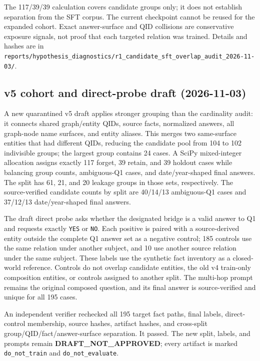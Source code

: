 \documentclass[10pt,a4paper]{article}
\begin{document}
The 117/39/39 calculation covers candidate groups only; it does not establish separation from the SFT corpus. The current checkpoint cannot be reused for the expanded cohort. Exact answer-surface and QID collisions are conservative exposure signals, not proof that each targeted relation was trained. Details and hashes are in \texttt{reports/hypothesis\_diagnostics/r1\_candidate\_sft\_overlap\_audit\_2026-11-03/}.

\subsection*{v5 cohort and direct-probe draft (2026-11-03)}

A new quarantined v5 draft applies stronger grouping than the cardinality audit: it connects shared graph/entity QIDs, source facts, normalized answers, all graph-node name surfaces, and entity aliases. This merges two same-surface entities that had different QIDs, reducing the candidate pool from 104 to 102 indivisible groups; the largest group contains 24 cases. A SciPy mixed-integer allocation assigns exactly 117 forget, 39 retain, and 39 holdout cases while balancing group counts, ambiguous-Q1 cases, and date/year-shaped final answers. The split has 61, 21, and 20 leakage groups in those sets, respectively. The source-verified candidate counts by split are 40/14/13 ambiguous-Q1 cases and 37/12/13 date/year-shaped final answers.

The draft direct probe asks whether the designated bridge is a valid answer to Q1 and requests exactly \texttt{YES} or \texttt{NO}. Each positive is paired with a source-derived entity outside the complete Q1 answer set as a negative control; 185 controls use the same relation under another subject, and 10 use another source relation under the same subject. These labels use the synthetic fact inventory as a closed-world reference. Controls do not overlap candidate entities, the old v4 train-only composition entities, or controls assigned to another split. The multi-hop prompt remains the original composed question, and its final answer is source-verified and unique for all 195 cases.

An independent verifier rechecked all 195 target fact paths, final labels, direct-control membership, source hashes, artifact hashes, and cross-split group/QID/fact/answer-surface separation. It passed. The new split, labels, and prompts remain \textbf{DRAFT\_NOT\_APPROVED}; every artifact is marked \texttt{do\_not\_train} and \texttt{do\_not\_evaluate}.
\end{document}
